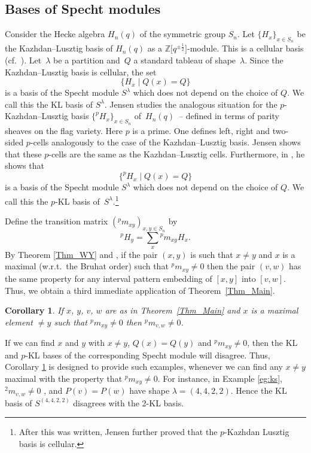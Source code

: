 \documentclass[pdftex]{sigma}
\numberwithin{equation}{section}
\newtheorem{Corollary}[Theorem]{Corollary}
\def\la{\lambda}
\begin{document}
\subsection{Bases of Specht modules}\label{sec:specht}

Consider the Hecke algebra $H_n(q)$ of the symmetric group $S_n$. Let $\{H_x\}_{x\in S_n}$ be the Kazhdan--Lusztig basis of $H_n(q)$ as a $\mathbb{Z}\big[q^{\pm \frac{1}{2}}\big]$-module.
This is a cellular basis (cf.\ \cite[Example~1.2]{grahamlehrer}). Let~$\la$ be a partition and~$Q$ a standard tableau of shape~$\la$. Since the Kazhdan--Lusztig basis is cellular, the set
\[
\{H_x\mid Q(x)=Q\}
\]
is a basis of the Specht module $S^\la$ which does not depend on the choice of $Q$. We call this the KL basis of $S^\lambda$.
Jensen \cite{thorge} studies the analogous situation for the $p$-Kazhdan--Lusztig basis $\{^pH_x\}_{x\in S_n}$ of~$H_n(q)$~-- defined in terms of parity sheaves on the flag variety. Here $p$ is a prime. One defines left, right and two-sided $p$-cells analogously to the case of the Kazhdan--Lusztig basis. Jensen \cite[Theorem~4.33]{thorge} shows that these $p$-cells are the same as the Kazhdan--Lusztig cells. Furthermore, in \cite[Corollary~4.39]{thorge}, he shows that
\[
\{^pH_x\mid Q(x)=Q\}
\]
is a basis of the Specht module $S^\la$ which does not depend on the choice of $Q$. We call this the $p$-KL basis of~$S^\lambda$.\footnote{After this was written, Jensen \cite{jensencellular} further proved that the $p$-Kazhdan Lusztig basis is cellular.}

Define the transition matrix $(^pm_{xy})_{x,y\in S_n}$ by
\[
^pH_y = \sum_x {}^pm_{xy} H_x.
\]
By Theorem \ref{Thm_WY} and \cite[Theorem 3.7]{williamson14}, if the pair $(x,y)$ is such that $x\neq y$ and $x$ is a maximal (w.r.t.\ the Bruhat order) such that ${}^pm_{xy}\neq 0$ then the pair $(v,w)$ has the same property for any interval pattern embedding of $[x,y]$ into $[v,w]$.
Thus, we obtain a third immediate application of Theorem~\ref{Thm_Main}.

\begin{Corollary}\label{Cor_Specht}
If $x$, $y$, $v$, $w$ are as in Theorem~{\rm \ref{Thm_Main}} and $x$ is a maximal element $\neq y$ such that ${}^pm_{xy}\neq 0$ then ${}^pm_{v,w}\neq 0$.
\end{Corollary}
If we can find $x$ and $y$ with $x\neq y$, $Q(x)=Q(y)$ and $^pm_{xy}\neq 0$, then the KL and $p$-KL bases of the corresponding Specht module will disagree. Thus, Corollary \ref{Cor_Specht} is designed to provide such examples, whenever we can find any $x\neq y$ maximal with the property that $^pm_{xy}\neq 0$. For instance, in Example \ref{eg:ks}, $^2m_{v,w}\neq 0$ \cite[Section~5.6]{thorgegeordie}, and $P(v)=P(w)$ have shape $\lambda=(4,4,2,2)$. Hence the KL basis of $S^{(4,4,2,2)}$ disagrees with the 2-KL basis.
\end{document}
